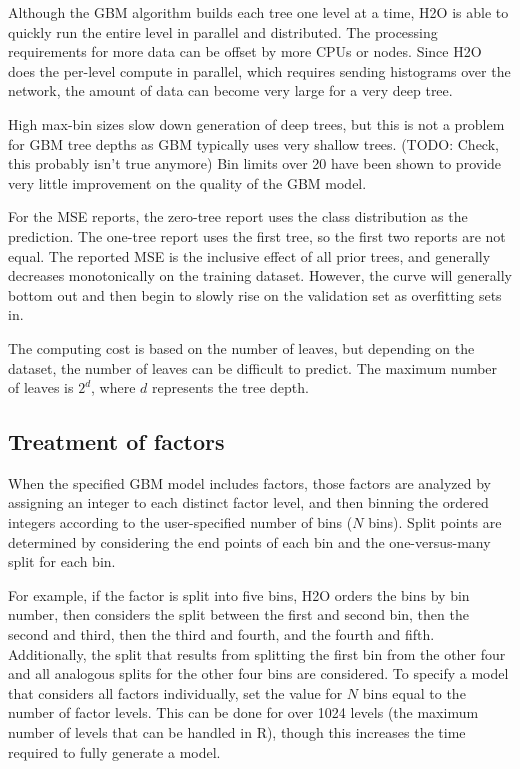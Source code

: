 Although the GBM algorithm builds each tree one level at a time, H2O is able to quickly run the entire level in
parallel and distributed. The processing requirements for more data can be offset by more CPUs or nodes.
Since H2O does the per-level compute in parallel, which requires sending histograms over the network, the amount
of data can become very large for a very deep tree.

High max-bin sizes slow down generation of deep trees, but this is not a problem for GBM tree depths as GBM
typically uses very shallow trees. (TODO: Check, this probably isn't true anymore)  Bin limits over 20 have been shown to provide very little improvement on the quality of the GBM model.

For the MSE reports, the zero-tree report uses the class distribution as the prediction. The one-tree report
uses the first tree, so the first two reports are not equal. The reported MSE is the inclusive effect of all
prior trees, and generally decreases monotonically on the training dataset. However, the curve will generally
bottom out and then begin to slowly rise on the validation set as overfitting sets in.

The computing cost is based on the number of leaves, but depending on the dataset, the number of leaves can be
difficult to predict. The maximum number of leaves is $2^d$, where $d$ represents the tree depth.

\subsection{Treatment of factors}

When the specified GBM model includes factors, those factors are analyzed by assigning an integer to each distinct
factor level, and then binning the ordered integers according to the user-specified number of bins ($N$ bins). Split
points are determined by considering the end points of each bin and the one-versus-many split for each bin.

For example, if the factor is split into five bins, H2O orders the bins by bin number, then considers the split between the first and second bin, then the second and third, then the third and fourth, and the fourth and fifth.
Additionally, the split that results from splitting the first bin from the other four and all analogous splits for
the other four bins are considered. To specify a model that considers all factors individually, set the value for
$N$ bins equal to the number of factor levels. This can be done for over 1024 levels (the maximum number of levels
that can be handled in R), though this increases the time required to fully generate a model.

